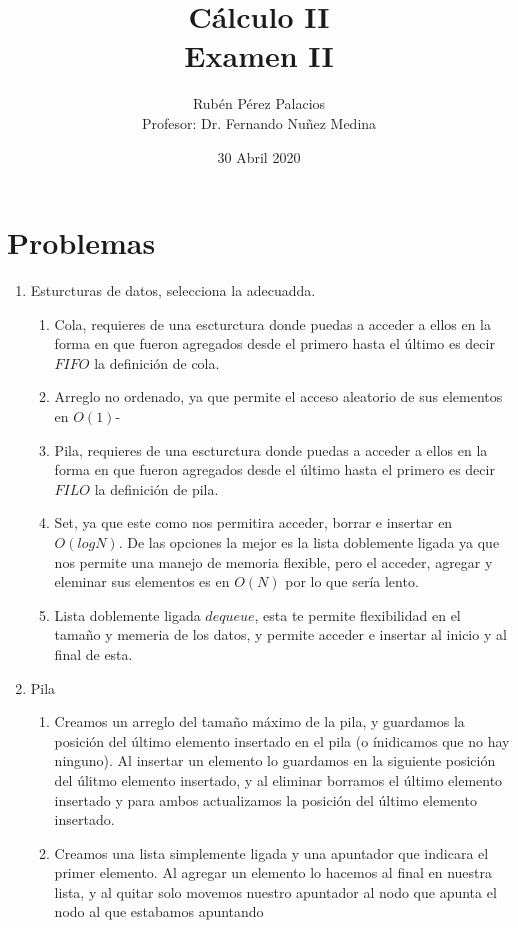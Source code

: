 \documentclass[letterpaper]{article}
\title{Cálculo II\\Examen II}
\author{Rubén Pérez Palacios\\Profesor: Dr. Fernando Nuñez Medina}
\date{30 Abril 2020}
\theoremstyle{definition}
\theoremstyle{lemathm}
\theoremstyle{lemademthm}
\begin{document}
	\maketitle

	\section*{Problemas}

	\begin{enumerate}
		\item Esturcturas de datos, selecciona la adecuadda.
		\begin{enumerate}
			\item Cola, requieres de una escturctura donde puedas a acceder a ellos en la forma en que fueron agregados desde el primero hasta el último es decir $FIFO$ la definición de cola.
			\item Arreglo no ordenado, ya que permite el acceso aleatorio de sus elementos en $O(1)$-
			\item Pila, requieres de una escturctura donde puedas a acceder a ellos en la forma en que fueron agregados desde el último hasta el primero es decir $FILO$ la definición de pila.
			\item Set, ya que este como nos permitira acceder, borrar e insertar en $O(logN)$. De las opciones la mejor es la lista doblemente ligada ya que nos permite una manejo de memoria flexible, pero el acceder, agregar y eleminar sus elementos es en $O(N)$ por lo que sería lento.
			\item Lista doblemente ligada $dequeue$, esta te permite flexibilidad en el tamaño y memeria de los datos, y permite acceder e insertar al inicio y al final de esta.
		\end{enumerate}
		\item Pila
		\begin{enumerate}
			\item Creamos un arreglo del tamaño máximo de la pila, y guardamos la posición del último elemento insertado en el pila (o ínidicamos que no hay ninguno). Al insertar un elemento lo guardamos en la siguiente posición del úlitmo elemento insertado, y al eliminar borramos el último elemento insertado y para ambos actualizamos la posición del último elemento insertado.
			\item Creamos una lista simplemente ligada y una apuntador que indicara el primer elemento. Al agregar un elemento lo hacemos al final en nuestra lista, y al quitar solo movemos nuestro apuntador al nodo que apunta el nodo al que estabamos apuntando

\end{enumerate}
\end{enumerate}
\end{document}
